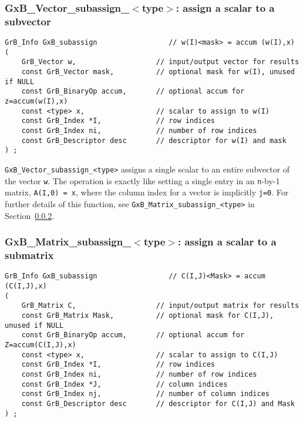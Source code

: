 \documentclass[12pt]{article}
\begin{document}
\subsubsection{{\sf GxB\_Vector\_subassign\_$<$type$>$:} assign a scalar to a subvector}
\label{subassign_vector_scalar}

\begin{mdframed}[userdefinedwidth=6in]
{\footnotesize
\begin{verbatim}
GrB_Info GxB_subassign                 // w(I)<mask> = accum (w(I),x)
(
    GrB_Vector w,                   // input/output vector for results
    const GrB_Vector mask,          // optional mask for w(I), unused if NULL
    const GrB_BinaryOp accum,       // optional accum for z=accum(w(I),x)
    const <type> x,                 // scalar to assign to w(I)
    const GrB_Index *I,             // row indices
    const GrB_Index ni,             // number of row indices
    const GrB_Descriptor desc       // descriptor for w(I) and mask
) ;
\end{verbatim} } \end{mdframed}

\verb'GxB_Vector_subassign_<type>' assigns a single scalar to an entire
subvector of the vector \verb'w'.  The operation is exactly like setting a
single entry in an \verb'n'-by-1 matrix, \verb'A(I,0) = x', where the column
index for a vector is implicitly \verb'j=0'.  For further details of this
function, see \verb'GxB_Matrix_subassign_<type>' in
Section~\ref{subassign_matrix_scalar}.

\newpage
\subsubsection{{\sf GxB\_Matrix\_subassign\_$<$type$>$:} assign a scalar to a submatrix}
\label{subassign_matrix_scalar}

\begin{mdframed}[userdefinedwidth=6in]
{\footnotesize
\begin{verbatim}
GrB_Info GxB_subassign                 // C(I,J)<Mask> = accum (C(I,J),x)
(
    GrB_Matrix C,                   // input/output matrix for results
    const GrB_Matrix Mask,          // optional mask for C(I,J), unused if NULL
    const GrB_BinaryOp accum,       // optional accum for Z=accum(C(I,J),x)
    const <type> x,                 // scalar to assign to C(I,J)
    const GrB_Index *I,             // row indices
    const GrB_Index ni,             // number of row indices
    const GrB_Index *J,             // column indices
    const GrB_Index nj,             // number of column indices
    const GrB_Descriptor desc       // descriptor for C(I,J) and Mask
) ;
\end{verbatim} } \end{mdframed}
\end{document}
